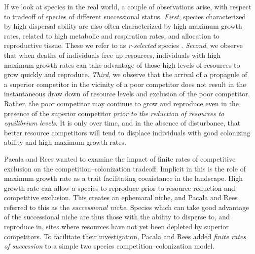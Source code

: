 If we look at species in the real world, a couple of observations arise, with respect to tradeoff of species of different successional status. \emph{First}, species characterized by high dispersal ability are also often characterized by high maximum growth rates, related to high metabolic and respiration rates, and allocation to reproductive tissue. These we refer to as \emph{r-selected} species \cite{MacArthur1967,MacArthur:1962lr}.  \emph{Second}, we observe that when deaths of individuals free up resources, individuals with high maximum growth rates can take advantage of those high levels of resources to grow quickly and reproduce. \emph{Third}, we observe that the arrival of a propagule of a superior competitor in the vicinity of a poor competitor does not result in the instantaneous draw down of resource levels and exclusion of the poor competitor. Rather, the poor competitor may continue to grow and reproduce even in the presence of the superior competitor \emph{prior to the reduction of resources to equilibrium levels}. It is only over time, and in the absence of disturbance, that better resource competitors will tend to displace individuals with good colonizing ability and high maximum growth rates.

Pacala and Rees \cite{Pacala1998} wanted to examine the impact of finite rates of competitive exclusion on the competition--colonization tradeoff. Implicit in this is the role of maximum growth rate as a trait facilitating coexistance in the landscape. High growth rate can allow a species to reproduce prior to resource reduction and competitive exclusion. This creates an ephemaral niche, and Pacala and Rees referred to this as the \emph{successional niche}. Species which can take good advantage of the successional niche are thus those with the ability to disperse to, and reproduce in, sites where resources have not yet been depleted by superior competitors. To facilitate their investigation, Pacala and Rees added \emph{finite rates of succession} to a simple two species competition--colonization model. 

